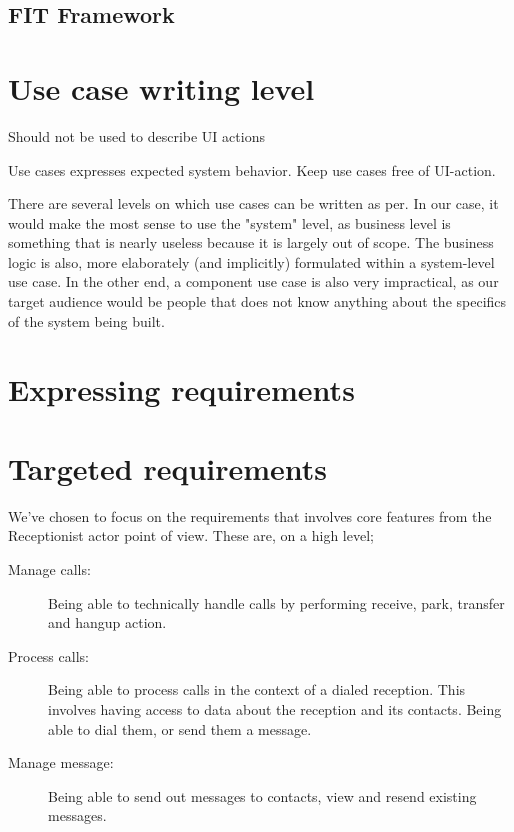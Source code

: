 \documentclass[10pt]{scrreprt}
\begin{document}
\subsection{FIT Framework}





\section{Use case writing level}
Should not be used to describe UI actions%

Use cases expresses expected system behavior. Keep use cases free of UI-action.

There are several levels on which use cases can be written as per\cite{cockburn??}. In our case, it would make the most sense to use the "system" level, as business level is something that is nearly useless because it is largely out of scope. The business logic is also, more elaborately (and implicitly) formulated within a system-level use case. In the other end, a component use case is also very impractical, as our target audience would be people that does not know anything about the specifics of the system being built.


\section{Expressing requirements}

\section{Targeted requirements}
We've chosen to focus on the requirements that involves core features from the Receptionist actor point of view. These are, on a high level;
\begin{description}
  \item[Manage calls:] Being able to technically handle calls by performing receive, park, transfer and hangup action.
  \item[Process calls:] Being able to process calls in the context of a dialed reception. This involves having access to data about the reception and its contacts. Being able to dial them, or send them a message.
  \item[Manage message:] Being able to send out messages to contacts, view and resend existing messages.
\end{description}
\end{document}
